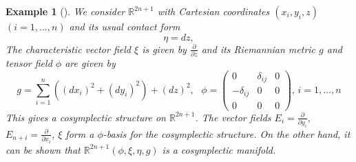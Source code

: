 \documentclass{amsart}
\theoremstyle{plain}
\newtheorem{example}{Example}
\numberwithin{equation}{section}
\begin{document}
\begin{example}[\protect\cite{O}]
We consider $\mathbb{R}
^{2n+1}$ with Cartesian coordinates $(x_{i},y_{i},z)$ $(i=1,...,n)$ and its
usual contact form 
\begin{equation*}
\eta =dz,
\end{equation*}The characteristic vector field $\xi $ is given by $\frac{\partial }{\partial z}$ and its Riemannian metric $g$ and tensor field $\phi $ are
given by\begin{equation*}
g=\sum\limits_{i=1}^{n}((dx_{i})^{2}+(dy_{i})^{2})+(dz)^{2},\text{ \ }\phi
=\left( 
\begin{array}{ccc}
0 & \delta _{ij} & 0 \\ 
-\delta _{ij} & 0 & 0 \\ 
0 & 0 & 0\end{array}\right) \text{, \ }i=1,...,n
\end{equation*}This gives a cosymplectic structure on $\mathbb{R}
^{2n+1}$. The vector fields $E_{i}=\frac{\partial }{\partial y_{i}},$ $E_{n+i}=\frac{\partial }{\partial x_{i}}$, $\xi $ form a $\phi $-basis for
the cosymplectic structure. On the other hand, it can be shown that $\mathbb{R}
^{2n+1}(\phi ,\xi ,\eta ,g)$ is a cosymplectic manifold.
\end{example}
\end{document}
